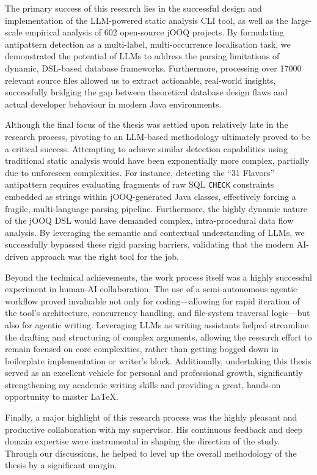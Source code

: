 The primary success of this research lies in the successful design and implementation of the LLM-powered static analysis CLI tool, as well as the large-scale empirical analysis of \num{602} open-source jOOQ projects. By formulating antipattern detection as a multi-label, multi-occurrence localisation task, we demonstrated the potential of LLMs to address the parsing limitations of dynamic, DSL-based database frameworks. Furthermore, processing over \num{17000} relevant source files allowed us to extract actionable, real-world insights, successfully bridging the gap between theoretical database design flaws and actual developer behaviour in modern Java environments.

Although the final focus of the thesis was settled upon relatively late in the research process, pivoting to an LLM-based methodology ultimately proved to be a critical success. Attempting to achieve similar detection capabilities using traditional static analysis would have been exponentially more complex, partially due to unforeseen complexities. For instance, detecting the “31 Flavors” antipattern requires evaluating fragments of raw SQL \texttt{CHECK} constraints embedded as strings within jOOQ-generated Java classes, effectively forcing a fragile, multi-language parsing pipeline. Furthermore, the highly dynamic nature of the jOOQ DSL would have demanded complex, intra-procedural data flow analysis. By leveraging the semantic and contextual understanding of LLMs, we successfully bypassed these rigid parsing barriers, validating that the modern AI-driven approach was the right tool for the job.

Beyond the technical achievements, the work process itself was a highly successful experiment in human-AI collaboration. The use of a semi-autonomous agentic workflow proved invaluable not only for coding—allowing for rapid iteration of the tool's architecture, concurrency handling, and file-system traversal logic—but also for agentic writing. Leveraging LLMs as writing assistants helped streamline the drafting and structuring of complex arguments, allowing the research effort to remain focused on core complexities, rather than getting bogged down in boilerplate implementation or writer's block. Additionally, undertaking this thesis served as an excellent vehicle for personal and professional growth, significantly strengthening my academic writing skills and providing a great, hands-on opportunity to master LaTeX.

Finally, a major highlight of this research process was the highly pleasant and productive collaboration with my supervisor. His continuous feedback and deep domain expertise were instrumental in shaping the direction of the study. Through our discussions, he helped to level up the overall methodology of the thesis by a significant margin.

